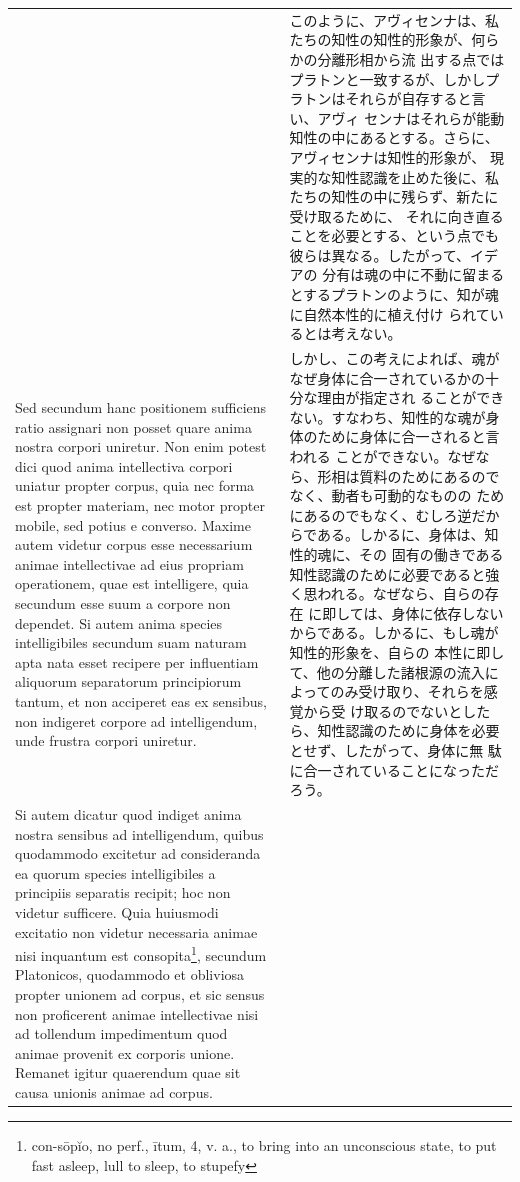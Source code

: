 \documentclass[paper=a4paper,fontsize=10pt,jafontsize=9pt,titlepage]{jlreq}
\begin{document}
\begin{longtable}{p{21em}p{21em}}
 &

 このように、アヴィセンナは、私たちの知性の知性的形象が、何らかの分離形相から流
 出する点ではプラトンと一致するが、しかしプラトンはそれらが自存すると言い、アヴィ
 センナはそれらが能動知性の中にあるとする。さらに、アヴィセンナは知性的形象が、
 現実的な知性認識を止めた後に、私たちの知性の中に残らず、新たに受け取るために、
 それに向き直ることを必要とする、という点でも彼らは異なる。したがって、イデアの
 分有は魂の中に不動に留まるとするプラトンのように、知が魂に自然本性的に植え付け
 られているとは考えない。

\\[1em]

 Sed secundum hanc positionem sufficiens ratio assignari non posset quare anima
 nostra corpori uniretur. Non enim potest dici quod anima intellectiva corpori
 uniatur propter corpus, quia nec forma est propter materiam, nec motor propter
 mobile, sed potius e converso. Maxime autem videtur corpus esse necessarium
 animae intellectivae ad eius propriam operationem, quae est intelligere, quia
 secundum esse suum a corpore non dependet. Si autem anima species
 intelligibiles secundum suam naturam apta nata esset recipere per influentiam
 aliquorum separatorum principiorum tantum, et non acciperet eas ex sensibus,
 non indigeret corpore ad intelligendum, unde frustra corpori uniretur.
 
 &

 しかし、この考えによれば、魂がなぜ身体に合一されているかの十分な理由が指定され
 ることができない。すなわち、知性的な魂が身体のために身体に合一されると言われる
 ことができない。なぜなら、形相は質料のためにあるのでなく、動者も可動的なものの
 ためにあるのでもなく、むしろ逆だからである。しかるに、身体は、知性的魂に、その
 固有の働きである知性認識のために必要であると強く思われる。なぜなら、自らの存在
 に即しては、身体に依存しないからである。しかるに、もし魂が知性的形象を、自らの
 本性に即して、他の分離した諸根源の流入によってのみ受け取り、それらを感覚から受
 け取るのでないとしたら、知性認識のために身体を必要とせず、したがって、身体に無
 駄に合一されていることになっただろう。

\\[1em]

 Si autem dicatur quod indiget anima nostra sensibus ad intelligendum, quibus
 quodammodo excitetur ad consideranda ea quorum species intelligibiles a
 principiis separatis recipit; hoc non videtur sufficere. Quia huiusmodi
 excitatio non videtur necessaria animae nisi inquantum est
 consopita\footnote{con-sōpĭo, no perf., ītum, 4, v. a., to bring into an
 unconscious state, to put fast asleep, lull to sleep, to stupefy}, secundum
 Platonicos, quodammodo et obliviosa propter unionem ad corpus, et sic sensus
 non proficerent animae intellectivae nisi ad tollendum impedimentum quod animae
 provenit ex corporis unione. Remanet igitur quaerendum quae sit causa unionis
 animae ad corpus.
 

\end{longtable}
\end{document}
